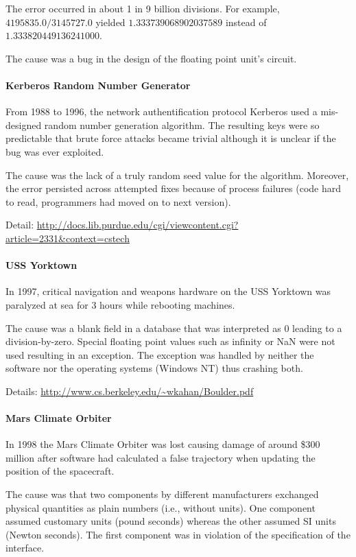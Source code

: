 The error occurred in about 1 in 9 billion divisions.
For example, $4195835.0/3145727.0$ yielded $1.333 739 068 902 037 589$ instead of $1.333 820 449 136 241 000$.

The cause was a bug in the design of the floating point unit's circuit.

\paragraph{Kerberos Random Number Generator}
From 1988 to 1996, the network authentification protocol Kerberos used a mis-designed random number generation algorithm.
The resulting keys were so predictable that brute force attacks became trivial although it is unclear if the bug was ever exploited.

The cause was the lack of a truly random seed value for the algorithm.
Moreover, the error persisted across attempted fixes because of process failures (code hard to read, programmers had moved on to next version).

Detail: \url{http://docs.lib.purdue.edu/cgi/viewcontent.cgi?article=2331&context=cstech}

\paragraph{USS Yorktown}
In 1997, critical navigation and weapons hardware on the USS Yorktown was paralyzed at sea for $3$ hours while rebooting machines.

The cause was a blank field in a database that was interpreted as $0$ leading to a division-by-zero.
Special floating point values such as infinity or NaN were not used resulting in an exception.
The exception was handled by neither the software nor the operating systems (Windows NT) thus crashing both.

Details: \url{http://www.cs.berkeley.edu/~wkahan/Boulder.pdf}

\paragraph{Mars Climate Orbiter}
In 1998 the Mars Climate Orbiter was lost causing damage of around \$$300$ million after software had calculated a false trajectory when updating the position of the spacecraft.

The cause was that two components by different manufacturers exchanged physical quantities as plain numbers (i.e., without units).
One component assumed customary units (pound seconds) whereas the other assumed SI units (Newton seconds).
The first component was in violation of the specification of the interface.

